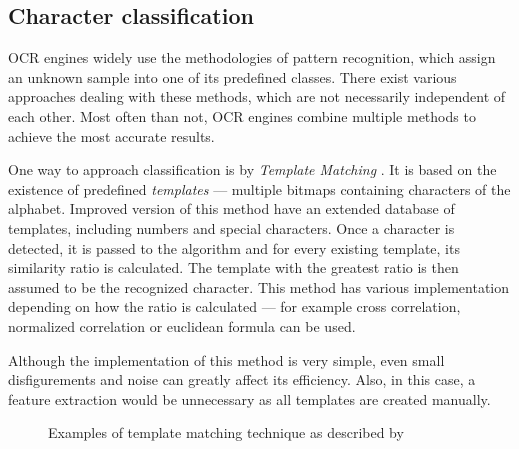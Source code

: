 \subsection{Character classification}

OCR engines widely use the methodologies of pattern recognition, which assign an unknown sample into one of its predefined classes. There exist various approaches dealing with these methods, which are not necessarily independent of each other. Most often than not, OCR engines combine multiple methods to achieve the most accurate results.

One way to approach classification is by \emph{Template Matching} \citep{templateMatching}. It is based on the existence of predefined \emph{templates} --- multiple bitmaps containing characters of the alphabet. Improved version of this method have an extended database of templates, including numbers and special characters. Once a character is detected, it is passed to the algorithm and for every existing template, its similarity ratio is calculated. The template with the greatest ratio is then assumed to be the recognized character. This method has various implementation depending on how the ratio is calculated --- for example cross correlation, normalized correlation or euclidean formula can be used.

Although the implementation of this method is very simple, even small disfigurements and noise can greatly affect its efficiency. Also, in this case, a feature extraction would be unnecessary as all templates are created manually.

\begin{figure}[H]
    \noindent
	\caption{Examples of template matching technique as described by \citet{Ning1993AnIO}}
	\label{fig:mff}
\end{figure}

